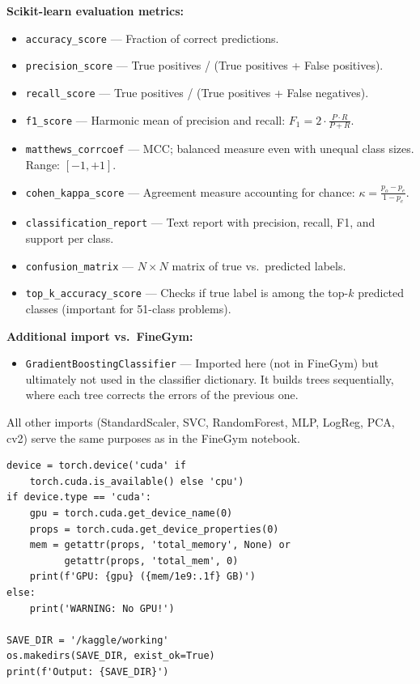 \begin{explanation}
\textbf{Scikit-learn evaluation metrics:}
\begin{itemize}[nosep]
  \item \texttt{accuracy\_score} --- Fraction of correct predictions.
  \item \texttt{precision\_score} --- True positives / (True positives + False positives).
  \item \texttt{recall\_score} --- True positives / (True positives + False negatives).
  \item \texttt{f1\_score} --- Harmonic mean of precision and recall: $F_1 = 2 \cdot \frac{P \cdot R}{P + R}$.
  \item \texttt{matthews\_corrcoef} --- MCC; balanced measure even with unequal class sizes. Range: $[-1, +1]$.
  \item \texttt{cohen\_kappa\_score} --- Agreement measure accounting for chance: $\kappa = \frac{p_o - p_e}{1 - p_e}$.
  \item \texttt{classification\_report} --- Text report with precision, recall, F1, and support per class.
  \item \texttt{confusion\_matrix} --- $N \times N$ matrix of true vs.\ predicted labels.
  \item \texttt{top\_k\_accuracy\_score} --- Checks if true label is among the top-$k$ predicted classes (important for 51-class problems).
\end{itemize}

\textbf{Additional import vs.\ FineGym:}
\begin{itemize}[nosep]
  \item \texttt{GradientBoostingClassifier} --- Imported here (not in FineGym) but ultimately not used in the classifier dictionary. It builds trees sequentially, where each tree corrects the errors of the previous one.
\end{itemize}

All other imports (StandardScaler, SVC, RandomForest, MLP, LogReg, PCA, cv2) serve the same purposes as in the FineGym notebook.
\end{explanation}

\begin{lstlisting}
device = torch.device('cuda' if
    torch.cuda.is_available() else 'cpu')
if device.type == 'cuda':
    gpu = torch.cuda.get_device_name(0)
    props = torch.cuda.get_device_properties(0)
    mem = getattr(props, 'total_memory', None) or
          getattr(props, 'total_mem', 0)
    print(f'GPU: {gpu} ({mem/1e9:.1f} GB)')
else:
    print('WARNING: No GPU!')

SAVE_DIR = '/kaggle/working'
os.makedirs(SAVE_DIR, exist_ok=True)
print(f'Output: {SAVE_DIR}')
\end{lstlisting}

